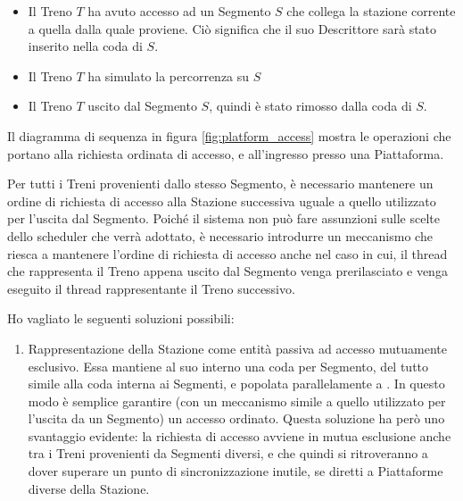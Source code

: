 			\begin{itemize}
				\item Il Treno $T$ ha avuto accesso ad un Segmento $S$ che collega la stazione corrente a quella dalla quale proviene. Ciò significa che il suo Descrittore sarà stato inserito nella coda  di $S$.
				\item Il Treno $T$ ha simulato la percorrenza su $S$ 
				\item Il Treno $T$ uscito dal Segmento $S$, quindi è stato rimosso dalla coda  di $S$.
			\end{itemize}
			
		Il diagramma di sequenza in figura \ref{fig:platform_access} mostra le operazioni che portano alla richiesta ordinata di accesso, e all'ingresso presso una Piattaforma.
		\begin{description}
			\item{}
		
		Per tutti i Treni provenienti dallo stesso Segmento, è necessario mantenere un ordine di richiesta di accesso alla Stazione successiva uguale a quello utilizzato per l'uscita dal Segmento. Poiché il sistema non può fare assunzioni sulle scelte dello scheduler che verrà adottato, è necessario introdurre un meccanismo che riesca a mantenere l'ordine di richiesta di accesso anche nel caso in cui, il thread che rappresenta il Treno appena uscito dal Segmento venga prerilasciato e venga eseguito il thread rappresentante il Treno successivo.

		Ho vagliato le seguenti soluzioni possibili:
		\begin{enumerate}
			\item Rappresentazione della Stazione come entità passiva ad accesso mutuamente esclusivo. Essa mantiene al suo interno una coda per Segmento, del tutto simile alla coda  interna ai Segmenti, e popolata parallelamente a . In questo modo è semplice garantire (con un meccanismo simile a quello utilizzato per l'uscita da un Segmento) un accesso ordinato. Questa soluzione ha però uno svantaggio evidente: la richiesta di accesso avviene in mutua esclusione anche tra i Treni provenienti da Segmenti diversi, e che quindi si ritroveranno a dover superare un punto di sincronizzazione inutile, se diretti a Piattaforme diverse della Stazione.
			

\end{enumerate}
\end{description}
